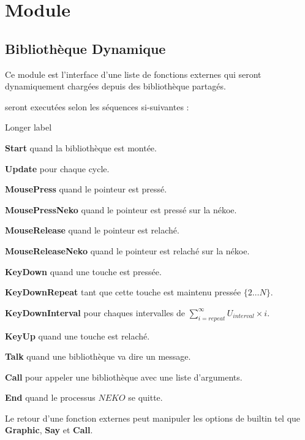 \documentclass{report}
\newcommand{\program}{\textit{NEKO}}
\begin{document}
\newpage

\section{Module}

\subsection{Bibliothèque Dynamique}

Ce module est l'interface d'une liste de fonctions externes qui seront dynamiquement chargées depuis des bibliothèque partagés.

seront executées selon les séquences si-suivantes :

\begin{labeling}{Longer label\quad}
	\item[\textbf{Start} quand la bibliothèque est montée.]
	\item[\textbf{Update} pour chaque cycle.]
	\item[\textbf{MousePress} quand le pointeur est pressé.]
	\item[\textbf{MousePressNeko} quand le pointeur est pressé sur la nékoe.]
	\item[\textbf{MouseRelease} quand le pointeur est relaché.]
	\item[\textbf{MouseReleaseNeko} quand le pointeur est relaché sur la nékoe.]
	\item[\textbf{KeyDown} quand une touche est pressée.]
	\item[\textbf{KeyDownRepeat} tant que cette touche est maintenu pressée $\{2\dots{}N\}$.]
	\item[\textbf{KeyDownInterval} pour chaques intervalles de $\sum_{i=repeat}^{\infty} U_{interval}\times{}i$.]
	\item[\textbf{KeyUp} quand une touche est relaché.]
	\item[\textbf{Talk} quand une bibliothèque va dire un message.]
	\item[\textbf{Call} pour appeler une bibliothèque avec une liste d'arguments.]
	\item[\textbf{End} quand le processus $\program$ se quitte.]
\end{labeling}

Le retour d'une fonction externes peut manipuler les options de builtin tel que \textbf{Graphic}, \textbf{Say} et \textbf{Call}.
\end{document}
